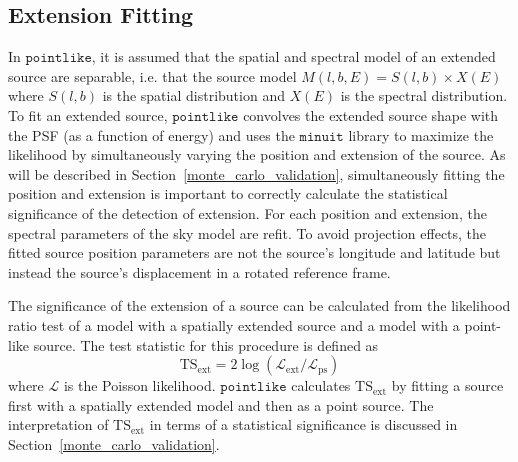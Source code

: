 \documentclass[12pt,preprint]{aastex}
\newcommand{\tsext}{{\ensuremath{\text{TS}_{\text{ext}}}}\xspace}
\newcommand{\likelihood}{\ensuremath{\mathcal{L}}\xspace}
\newcommand{\pointlike}{\ensuremath{\mathtt{pointlike}}\xspace}
\newcommand{\minuit}{\ensuremath{\mathtt{minuit}}\xspace}
\begin{document}
\subsection{Extension Fitting}
\label{extension_fitting}

In \pointlike, it is assumed that the spatial and spectral
model of an extended source are separable, i.e. that the source
model $M(l,b,E)=S(l,b)\times X(E)$ where $S(l,b)$ is the spatial
distribution and $X(E)$ is the spectral distribution.  To fit an extended source,
\pointlike convolves the extended source shape with the PSF (as a
function of energy) and uses the \minuit library 
\citep{minuit_documentation}
to maximize the
likelihood by simultaneously varying the position and extension of
the source.  As will be described in
Section~\ref{monte_carlo_validation}, simultaneously fitting the position
and extension is important to correctly calculate the statistical
significance of the detection of extension.  For each position and
extension, the spectral parameters of the sky model are refit.  To avoid
projection effects, the fitted source position parameters are not the
source's longitude and latitude but instead the source's displacement
in a rotated reference frame.

The significance of the extension of a source can be calculated from the
likelihood ratio test of a model with a spatially extended source and
a model with a point-like source. The test statistic for this procedure
is defined as
\begin{equation}
  \tsext=2\log(\likelihood_\text{ext}/\likelihood_\text{ps}) 
\end{equation}
where \likelihood is the Poisson likelihood.
\pointlike calculates \tsext by fitting a source first with a spatially
extended model and then as a point source.  The interpretation
of \tsext in terms of a statistical significance is discussed in
Section~\ref{monte_carlo_validation}.
\end{document}
